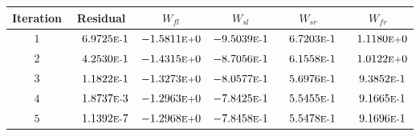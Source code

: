 \begin{tabular*}{\textwidth}{@{\extracolsep{\fill}} cccccc}
\\ 
\hline 
\hline 
Iteration & Residual & $W_{fl}$ & $W_{sl}$ & $W_{sr}$ & $W_{fr}$ \\ 
\hline 
$1$ & $\phantom{-} 6.9725\mbox{\sc{e}\smaller{-}}1$ & $-1.5811\mbox{\sc{e}\smaller{+}}0$ & $-9.5039\mbox{\sc{e}\smaller{-}}1$ & $\phantom{-} 6.7203\mbox{\sc{e}\smaller{-}}1$ & $\phantom{-} 1.1180\mbox{\sc{e}\smaller{+}}0$ \\ 
$2$ & $\phantom{-} 4.2530\mbox{\sc{e}\smaller{-}}1$ & $-1.4315\mbox{\sc{e}\smaller{+}}0$ & $-8.7056\mbox{\sc{e}\smaller{-}}1$ & $\phantom{-} 6.1558\mbox{\sc{e}\smaller{-}}1$ & $\phantom{-} 1.0122\mbox{\sc{e}\smaller{+}}0$ \\ 
$3$ & $\phantom{-} 1.1822\mbox{\sc{e}\smaller{-}}1$ & $-1.3273\mbox{\sc{e}\smaller{+}}0$ & $-8.0577\mbox{\sc{e}\smaller{-}}1$ & $\phantom{-} 5.6976\mbox{\sc{e}\smaller{-}}1$ & $\phantom{-} 9.3852\mbox{\sc{e}\smaller{-}}1$ \\ 
$4$ & $\phantom{-} 1.8737\mbox{\sc{e}\smaller{-}}3$ & $-1.2963\mbox{\sc{e}\smaller{+}}0$ & $-7.8425\mbox{\sc{e}\smaller{-}}1$ & $\phantom{-} 5.5455\mbox{\sc{e}\smaller{-}}1$ & $\phantom{-} 9.1665\mbox{\sc{e}\smaller{-}}1$ \\ 
$5$ & $\phantom{-} 1.1392\mbox{\sc{e}\smaller{-}}7$ & $-1.2968\mbox{\sc{e}\smaller{+}}0$ & $-7.8458\mbox{\sc{e}\smaller{-}}1$ & $\phantom{-} 5.5478\mbox{\sc{e}\smaller{-}}1$ & $\phantom{-} 9.1696\mbox{\sc{e}\smaller{-}}1$ \\ 
\hline 
\end{tabular*} 
